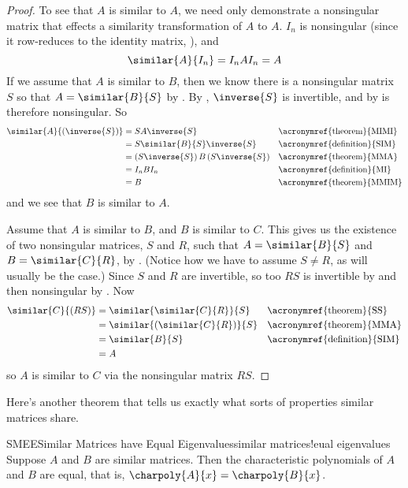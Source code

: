 \begin{proof}
To see that $A$ is similar to $A$, we need only demonstrate a nonsingular matrix that effects a similarity transformation of $A$ to $A$.  $I_n$ is nonsingular (since it row-reduces to the identity matrix, ), and
%
\begin{equation*}
\similar{A}{I_n}=I_nAI_n=A
\end{equation*}
%
If we assume that $A$ is similar to $B$, then we know there is a nonsingular matrix $S$ so that $A=\similar{B}{S}$ by .  By , $\inverse{S}$ is invertible, and by  is therefore nonsingular.  So
%
\begin{align*}
\similar{A}{(\inverse{S})}&=SA\inverse{S}&&\text{\acronymref{theorem}{MIMI}}\\
&=S\similar{B}{S}\inverse{S}&&\text{\acronymref{definition}{SIM}}\\
&=\left(S\inverse{S}\right)B\left(S\inverse{S}\right)&&\text{\acronymref{theorem}{MMA}}\\
&=I_nBI_n&&\text{\acronymref{definition}{MI}}\\
&=B&&\text{\acronymref{theorem}{MMIM}}
\end{align*}
%
and we see that $B$ is similar to $A$.\par
%
Assume that $A$ is similar to $B$, and $B$ is similar to $C$.  This gives us the existence of two nonsingular matrices, $S$ and $R$, such that $A=\similar{B}{S}$ and $B=\similar{C}{R}$, by .  (Notice how we have to assume $S\neq R$, as will usually be the case.)  Since $S$ and $R$ are invertible, so too $RS$ is invertible by  and then nonsingular by .  Now
%
\begin{align*}
\similar{C}{(RS)}&=\similar{\similar{C}{R}}{S}&&\text{\acronymref{theorem}{SS}}\\
&=\similar{\left(\similar{C}{R}\right)}{S}&&\text{\acronymref{theorem}{MMA}}\\
&=\similar{B}{S}&&\text{\acronymref{definition}{SIM}}\\
&=A
\end{align*}
%
so $A$ is similar to $C$ via the nonsingular matrix $RS$.
%
\end{proof}
%
Here's another theorem that tells us exactly what sorts of properties similar matrices share.
%
\begin{theorem}{SMEE}{Similar Matrices have Equal Eigenvalues}{similar matrices!eual eigenvalues}
Suppose $A$ and $B$ are similar matrices.  Then the characteristic polynomials of $A$ and $B$ are equal, that is, $\charpoly{A}{x}=\charpoly{B}{x}$.
\end{theorem}
